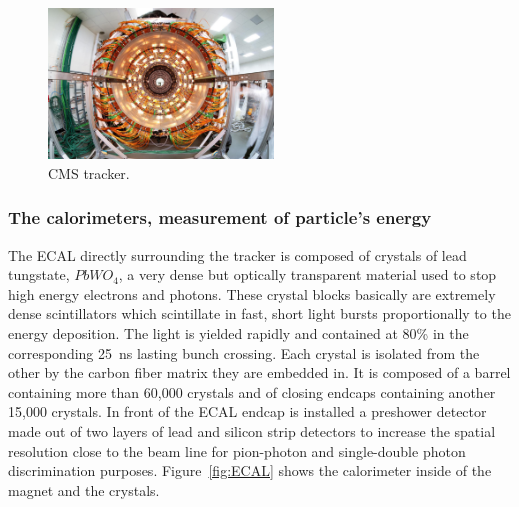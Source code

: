 	\begin{figure}[H]
		\centering
		\includegraphics[height = 4cm]{fig/chapt2/Tracker.jpg}
		\caption{\label{fig:tracker} CMS tracker.}
	\end{figure}
	
		\subsubsection{The calorimeters, measurement of particle's energy}
		\label{chapt2:sssec:calo}
	
	The ECAL directly surrounding the tracker is composed of crystals of lead tungstate, $PbWO_4$, a very dense but optically transparent material used to stop high energy electrons and photons. These crystal blocks basically are extremely dense scintillators which scintillate in fast, short light bursts proportionally to the energy deposition. The light is yielded rapidly and contained at 80\% in the corresponding \SI{25}{ns} lasting bunch crossing. Each crystal is isolated from the other by the carbon fiber matrix they are embedded in. It is composed of a barrel containing more than 60,000 crystals and of closing endcaps containing another 15,000 crystals. In front of the ECAL endcap is installed a preshower detector made out of two layers of lead and silicon strip detectors to increase the spatial resolution close to the beam line for pion-photon and single-double photon discrimination purposes. Figure~\ref{fig:ECAL} shows the calorimeter inside of the magnet and the crystals.
	
